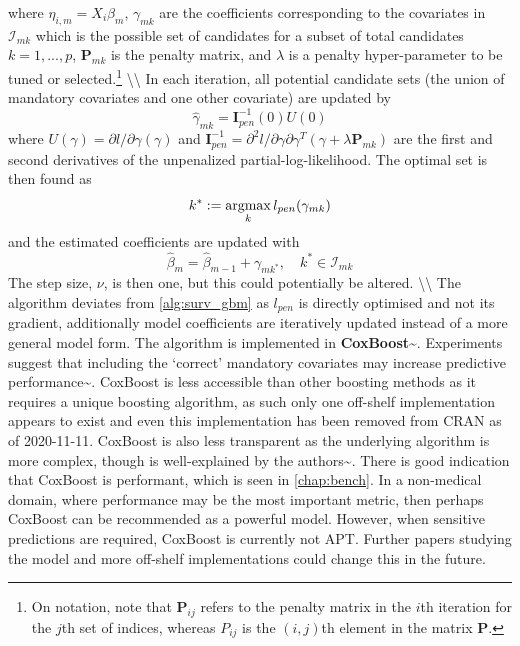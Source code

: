 \documentclass[
  letterpaper,
]{scrbook}
\theoremstyle{plain}
\theoremstyle{definition}
\theoremstyle{remark}
\begin{document}
where \(\eta_{i,m} = X_i\beta_m\), \(\gamma_{mk}\) are the coefficients
corresponding to the covariates in \(\mathcal{I}_{mk}\) which is the
possible set of candidates for a subset of total candidates
\(k = 1,...,p\), \(\mathbf{P}_{mk}\) is the penalty matrix, and
\(\lambda\) is a penalty hyper-parameter to be tuned or
selected.\footnote{On notation, note that $\mathbf{P}_{ij}$ refers to the penalty matrix in the $i$th iteration for the $j$th set of indices, whereas $P_{ij}$ is the $(i,j)$th element in the matrix $\mathbf{P}$.}
\textbackslash\textbackslash{} In each iteration, all potential
candidate sets (the union of mandatory covariates and one other
covariate) are updated by \[
\hat{\gamma}_{mk} = \mathbf{I}^{-1}_{pen}(0)U(0)
\] where \(U(\gamma) = \partial l / \partial \gamma (\gamma)\) and
\(\mathbf{I}^{-1}_{pen} = \partial^2 l/\partial\gamma\partial\gamma^T (\gamma + \lambda\mathbf{P}_{mk})\)
are the first and second derivatives of the unpenalized
partial-log-likelihood. The optimal set is then found as \[
k^* := \operatornamewithlimits{argmax}_k l_{pen}(\gamma_{mk})
\] and the estimated coefficients are updated with \[
\hat{\beta}_m = \hat{\beta}_{m-1} + \gamma_{mk^*}, \quad k^* \in \mathcal{I}_{mk}
\] The step size, \(\nu\), is then one, but this could potentially be
altered. \textbackslash\textbackslash{} The algorithm deviates from
\ref{alg:surv_gbm} as \(l_{pen}\) is directly optimised and not its
gradient, additionally model coefficients are iteratively updated
instead of a more general model form. The algorithm is implemented in
\textbf{CoxBoost}\textasciitilde{}\cite{pkgcoxboost}. Experiments
suggest that including the `correct' mandatory covariates may increase
predictive performance\textasciitilde{}\cite{Binder2008}. CoxBoost is
less accessible than other boosting methods as it requires a unique
boosting algorithm, as such only one off-shelf implementation appears to
exist and even this implementation has been removed from CRAN as of
2020-11-11. CoxBoost is also less transparent as the underlying
algorithm is more complex, though is well-explained by the
authors\textasciitilde{}\cite{Binder2008}. There is good indication that
CoxBoost is performant, which is seen in \ref{chap:bench}. In a
non-medical domain, where performance may be the most important metric,
then perhaps CoxBoost can be recommended as a powerful model. However,
when sensitive predictions are required, CoxBoost is currently not APT.
Further papers studying the model and more off-shelf implementations
could change this in the future.
\end{document}
